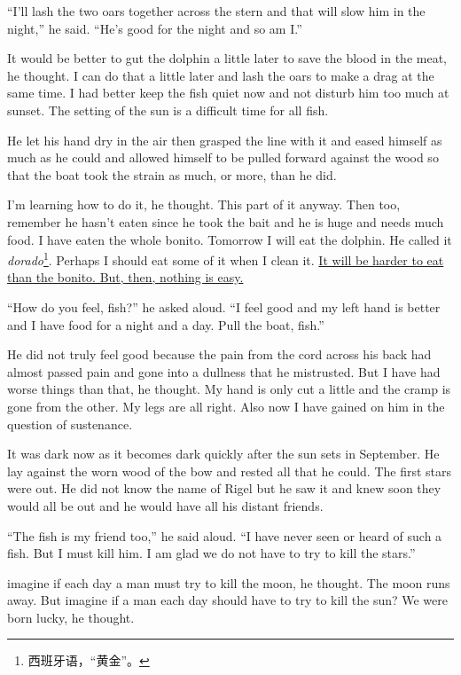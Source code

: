 ``I'll \gls{lash} the two oars together across the stern and that will slow
him in the night,'' he said. ``He's good for the night and so am I.''

It would be better to gut the dolphin a little later to save the blood in
the meat, he thought. I can do that a little later and lash the oars to make
a drag at the same time. I had better keep the fish quiet now and not
disturb him too much at sunset. The setting of the sun is a difficult time
for all fish.

He let his hand dry in the air then \gls{grasped} the line with it and
\gls{eased} himself as much as he could and allowed himself to be pulled
forward against the wood so that the boat took the strain as much, or more,
than he did.

I'm learning how to do it, he thought. This part of it anyway. Then too,
remember he hasn't eaten since he took the bait and he is huge and needs
much food. I have eaten the whole bonito. Tomorrow I will eat the dolphin.
He called it \emph{dorado}\footnote{西班牙语，“黄金”。}. Perhaps I should
eat some of it when I clean it. \uline{It will be harder to eat than the
  bonito. But, then, nothing is easy.}

``How do you feel, fish?'' he asked aloud. ``I feel good and my left hand is
better and I have food for a night and a day. Pull the boat, fish.''

He did not truly feel good because the pain from the cord across his back
had almost passed pain and gone into a \gls{dullness} that he
\gls{mistrusted}. But I have had worse things than that, he thought. My hand
is only cut a little and the cramp is gone from the other. My legs are all
right. Also now I have gained on him in the question of \gls{sustenance}.

It was dark now as it becomes dark quickly after the sun sets in September.
He lay against the \gls{worn} wood of the bow and rested all that he could. The
first stars were out. He did not know the name of \gls{Rigel} but he saw it and
knew soon they would all be out and he would have all his \gls{distant} friends.

``The fish is my friend too,'' he said aloud. ``I have never seen or heard
of such a fish. But I must kill him. I am glad we do not have to try to kill
the stars.''

\Gls{imagine} if each day a man must try to kill the moon, he thought. The moon
runs away. But imagine if a man each day should have to try to kill the sun?
We were born lucky, he thought.

